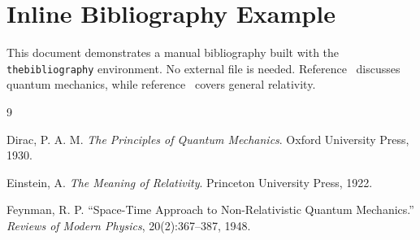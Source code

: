 \documentclass[11pt]{article}
\begin{document}
\section*{Inline Bibliography Example}

This document demonstrates a manual bibliography built with the
\texttt{thebibliography} environment. No external file is needed.
Reference~\cite{ref1} discusses quantum mechanics, while reference~\cite{ref2}
covers general relativity.

\begin{thebibliography}{9}

Dirac, P. A. M.
\textit{The Principles of Quantum Mechanics}.
Oxford University Press, 1930.

Einstein, A.
\textit{The Meaning of Relativity}.
Princeton University Press, 1922.

Feynman, R. P.
``Space-Time Approach to Non-Relativistic Quantum Mechanics.''
\textit{Reviews of Modern Physics}, 20(2):367--387, 1948.

\end{thebibliography}
\end{document}
